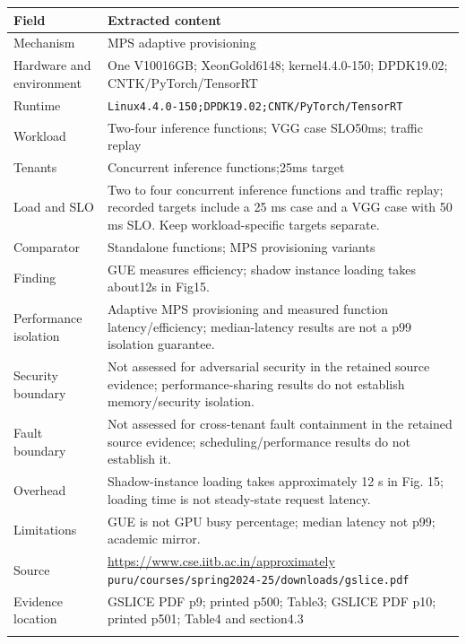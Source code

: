 \begin{longtable}{>{\raggedright\arraybackslash}p{}>{\raggedright\arraybackslash}p{}}
\toprule
\textbf{Field} & \textbf{Extracted content}\\\midrule\endhead
Mechanism & MPS adaptive provisioning\\\addlinespace
Hardware and environment & One V10016GB; XeonGold6148; kernel4.4.0-150; DPDK19.02; CNTK/PyTorch/TensorRT\\\addlinespace
Runtime & \nolinkurl{Linux4.4.0-150;DPDK19.02;CNTK/PyTorch/TensorRT}\\\addlinespace
Workload & Two-four inference functions; VGG case SLO50ms; traffic replay\\\addlinespace
Tenants & Concurrent inference functions;25ms target\\\addlinespace
Load and SLO & Two to four concurrent inference functions and traffic replay; recorded targets include a 25 ms case and a VGG case with 50 ms SLO. Keep workload-specific targets separate.\\\addlinespace
Comparator & Standalone functions; MPS provisioning variants\\\addlinespace
Finding & GUE measures efficiency; shadow instance loading takes about12s in Fig15.\\\addlinespace
Performance isolation & Adaptive MPS provisioning and measured function latency/efficiency; median-latency results are not a p99 isolation guarantee.\\\addlinespace
Security boundary & Not assessed for adversarial security in the retained source evidence; performance-sharing results do not establish memory/security isolation.\\\addlinespace
Fault boundary & Not assessed for cross-tenant fault containment in the retained source evidence; scheduling/performance results do not establish it.\\\addlinespace
Overhead & Shadow-instance loading takes approximately 12 s in Fig. 15; loading time is not steady-state request latency.\\\addlinespace
Limitations & GUE is not GPU busy percentage; median latency not p99; academic mirror.\\\addlinespace
Source & \url{https://www.cse.iitb.ac.in/approximately} \nolinkurl{puru/courses/spring2024-25/downloads/gslice.pdf}\\\addlinespace
Evidence location & GSLICE PDF p9; printed p500; Table3; GSLICE PDF p10; printed p501; Table4 and section4.3\\\addlinespace
\bottomrule\end{longtable}

